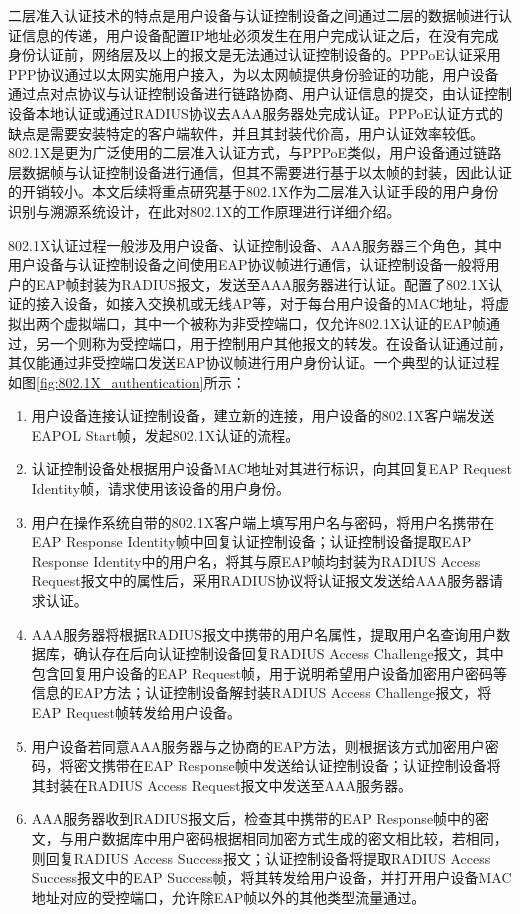       二层准入认证技术的特点是用户设备与认证控制设备之间通过二层的数据帧进行认证信息的传递，用户设备配置IP地址必须发生在用户完成认证之后，在没有完成身份认证前，网络层及以上的报文是无法通过认证控制设备的。PPPoE认证\cite{RFC2516}采用PPP协议通过以太网实施用户接入，为以太网帧提供身份验证的功能，用户设备通过点对点协议与认证控制设备进行链路协商、用户认证信息的提交，由认证控制设备本地认证或通过RADIUS协议去AAA服务器处完成认证。PPPoE认证方式的缺点是需要安装特定的客户端软件，并且其封装代价高，用户认证效率较低。802.1X\cite{ieee802ieee}是更为广泛使用的二层准入认证方式，与PPPoE类似，用户设备通过链路层数据帧与认证控制设备进行通信，但其不需要进行基于以太帧的封装，因此认证的开销较小。本文后续将重点研究基于802.1X作为二层准入认证手段的用户身份识别与溯源系统设计，在此对802.1X的工作原理进行详细介绍。
      
      802.1X认证过程一般涉及用户设备、认证控制设备、AAA服务器三个角色，其中用户设备与认证控制设备之间使用EAP协议帧进行通信，认证控制设备一般将用户的EAP帧封装为RADIUS报文，发送至AAA服务器进行认证。配置了802.1X认证的接入设备，如接入交换机或无线AP等，对于每台用户设备的MAC地址，将虚拟出两个虚拟端口，其中一个被称为非受控端口，仅允许802.1X认证的EAP帧通过，另一个则称为受控端口，用于控制用户其他报文的转发。在设备认证通过前，其仅能通过非受控端口发送EAP协议帧进行用户身份认证。一个典型的认证过程如图\ref{fig:802.1X_authentication}所示：
        \begin{enumerate}[1{)}]
          \item 用户设备连接认证控制设备，建立新的连接，用户设备的802.1X客户端发送EAPOL Start帧，发起802.1X认证的流程。
          \item 认证控制设备处根据用户设备MAC地址对其进行标识，向其回复EAP Request Identity帧，请求使用该设备的用户身份。
          \item 用户在操作系统自带的802.1X客户端上填写用户名与密码，将用户名携带在EAP Response Identity帧中回复认证控制设备；认证控制设备提取EAP Response Identity中的用户名，将其与原EAP帧均封装为RADIUS Access Request报文中的属性后，采用RADIUS协议将认证报文发送给AAA服务器请求认证。
          \item AAA服务器将根据RADIUS报文中携带的用户名属性，提取用户名查询用户数据库，确认存在后向认证控制设备回复RADIUS Access Challenge报文，其中包含回复用户设备的EAP Request帧，用于说明希望用户设备加密用户密码等信息的EAP方法；认证控制设备解封装RADIUS Access Challenge报文，将EAP Request帧转发给用户设备。
          \item 用户设备若同意AAA服务器与之协商的EAP方法，则根据该方式加密用户密码，将密文携带在EAP Response帧中发送给认证控制设备；认证控制设备将其封装在RADIUS Access Request报文中发送至AAA服务器。
          \item AAA服务器收到RADIUS报文后，检查其中携带的EAP Response帧中的密文，与用户数据库中用户密码根据相同加密方式生成的密文相比较，若相同，则回复RADIUS Access Success报文；认证控制设备将提取RADIUS Access Success报文中的EAP Success帧，将其转发给用户设备，并打开用户设备MAC地址对应的受控端口，允许除EAP帧以外的其他类型流量通过。
        \end{enumerate}
    
